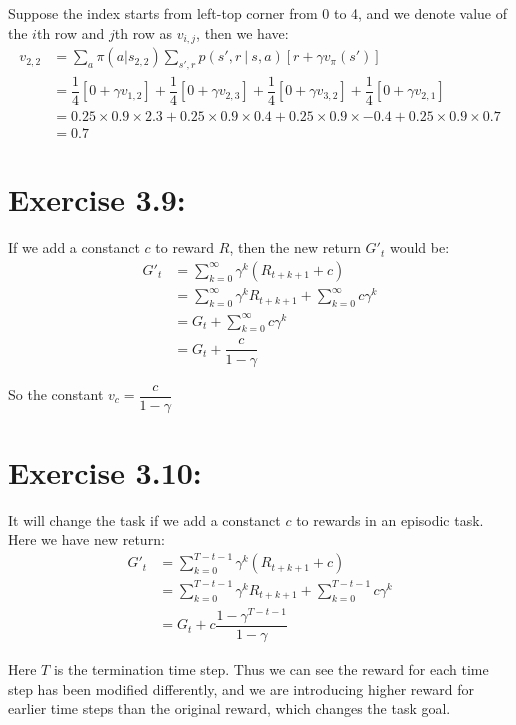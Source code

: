 \documentclass[10pt,letterpaper]{article}
\newcommand\given[1][]{\:#1\vert\:}
\begin{document}
Suppose the index starts from left-top corner from 0 to 4, and we denote value of the $i$th row and $j$th row as $v_{i,j}$, then we have:
\begin{align}
v_{2,2} &= \sum_a\pi(a|s_{2,2})\sum_{s',r}p(s',r\given s,a){[r+ \gamma v_\pi(s')]}\\
&= \dfrac{1}{4}[0+\gamma v_{1,2}] + \dfrac{1}{4}[0+\gamma v_{2,3}] + \dfrac{1}{4}[0+\gamma v_{3,2}] + \dfrac{1}{4}[0+\gamma v_{2,1}]\\
&= 0.25\times0.9\times2.3 + 0.25\times0.9\times0.4 + 0.25\times0.9\times-0.4 + 0.25\times0.9\times0.7\\
&= 0.7
\end{align}


\section*{Exercise 3.9: }
\label{3.9}

If we add a constanct $c$ to reward $R$, then the new return $G'_t$ would be:
\begin{align}
G'_t &= \sum_{k=0}^\infty\gamma^k(R_{t+k+1}+c)\\
&= \sum_{k=0}^\infty\gamma^kR_{t+k+1} + \sum_{k=0}^\infty c\gamma^k\\
&= G_t + \sum_{k=0}^\infty c\gamma^k\\
&= G_t + \dfrac{c}{1-\gamma}
\end{align}

So the constant $v_c = \dfrac{c}{1-\gamma}$


\section*{Exercise 3.10: }
\label{3.10}

It will change the task if we add a constanct $c$ to rewards in an episodic task. Here we have new return:
\begin{align}
G'_t &= \sum_{k=0}^{T-t-1}\gamma^k(R_{t+k+1}+c)\\
&= \sum_{k=0}^{T-t-1}\gamma^kR_{t+k+1} + \sum_{k=0}^{T-t-1} c\gamma^k\\
&= G_t + c\dfrac{1-\gamma^{T-t-1}}{1-\gamma}
\end{align}

Here $T$ is the termination time step. Thus we can see the reward for each time step has been modified differently, and we are introducing higher reward for earlier time steps than the original reward, which changes the task goal.
\end{document}
